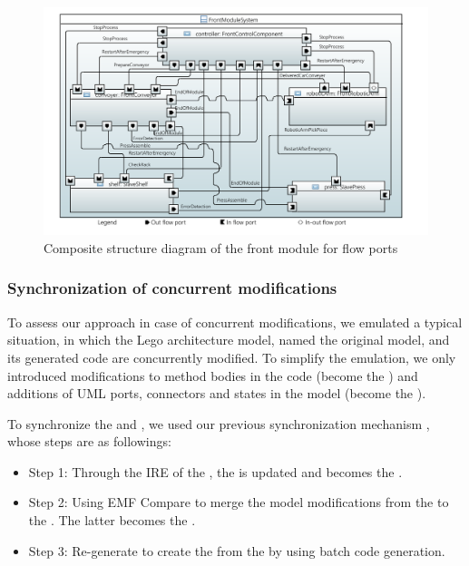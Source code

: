 \begin{figure}
	\centering
	\includegraphics[clip, trim=1cm 0.5cm 1.2cm 0.2cm, width=\columnwidth]{figures/frontcomposite.pdf}
	\caption{Composite structure diagram of the front module for flow ports} 
	\label{fig:legofront}
\end{figure}


\subsubsection{Synchronization of concurrent modifications}
To assess our approach in case of concurrent modifications, we emulated a typical situation, in which the Lego architecture model, named the original model, and its generated code are concurrently modified.
To simplify the emulation, we only introduced modifications to method bodies in the code (become the ) and additions of UML ports, connectors and states in the model (become the ).

To synchronize the  and , we used our previous synchronization mechanism \cite{foster2016}, whose steps are as followings:

\begin{itemize}[\footnotesize]
	\item Step 1: Through the IRE of the , the  is updated and becomes the . 
	
	\item Step 2: Using EMF Compare to merge the model modifications from the  to the .
	The latter becomes the .
	
	\item Step 3: Re-generate to create the  from the  by using batch code generation.
\end{itemize}


